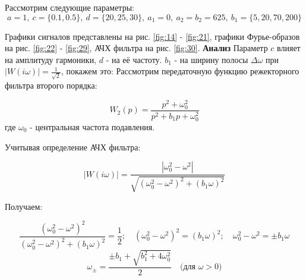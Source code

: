 Рассмотрим следующие параметры:
$$
a=1,\
c = \{0.1, 0.5\},\
d = \{20, 25, 30\},\
a_1 = 0,\
a_2 = b_2 = 625,\
b_1 = \{5, 20, 70, 200\} 
$$



Графики сигналов представлены на рис. \ref{fig:14} - \ref{fig:21}, графики Фурье-образов на рис. \ref{fig:22} - \ref{fig:29}, АЧХ фильтра на рис. \ref{fig:30}.\newline
\textbf{Анализ}
\newline
Параметр $c$ влияет на амплитуду гармоники, $d$ - на её частоту. $b_1$ - на ширину полосы $\Delta\omega$ при $|W(i\omega)|=\frac{1}{\sqrt{2}}$, покажем  это:
\newline
Рассмотрим передаточную функцию режекторного фильтра второго порядка:

$$
W_2(p) = \frac{p^2 + \omega_0^2}{p^2 + b_1 p + \omega_0^2}
$$
где $\omega_0$ - центральная частота подавления.

Учитывая определение АЧХ фильтра:

$$
|W(i\omega)| = \frac{|\omega_0^2 - \omega^2|}{\sqrt{(\omega_0^2 - \omega^2)^2 + (b_1 \omega)^2}}
$$

Получаем:

$$
\frac{(\omega_0^2 - \omega^2)^2}{(\omega_0^2 - \omega^2)^2 + (b_1 \omega)^2} = \frac{1}{2};\quad 
(\omega_0^2 - \omega^2)^2 = (b_1 \omega)^2;\quad
\omega_0^2 - \omega^2 = \pm b_1 \omega
$$$$
\omega_\pm = \frac{\pm b_1 + \sqrt{b_1^2 + 4\omega_0^2}}{2}\quad\text{(для $\omega>0$)}
$$

